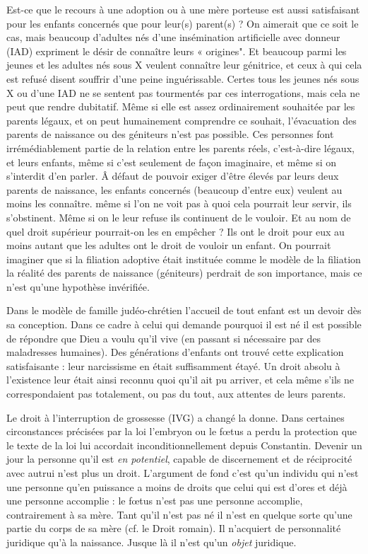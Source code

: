  Est-ce que le recours à une adoption ou à une mère porteuse est aussi satisfaisant pour les enfants concernés que pour leur(s) parent(s) ? On aimerait que ce soit le cas, mais beaucoup d'adultes nés d'une insémination artificielle avec donneur (IAD) expriment le désir de connaître leurs « origines". Et beaucoup parmi les jeunes et les adultes nés sous X veulent connaître leur génitrice, et ceux à qui cela est refusé disent souffrir d'une peine inguérissable. Certes tous les jeunes nés sous X ou d'une IAD ne se sentent pas tourmentés par ces interrogations, mais cela ne peut que rendre dubitatif. Même si elle est assez ordinairement souhaitée par les parents légaux, et on peut humainement comprendre ce souhait, l'évacuation des parents de naissance ou des géniteurs n'est pas possible. Ces personnes font irrémédiablement partie de la relation entre les parents réels, c'est-à-dire légaux, et leurs enfants, même si c'est seulement de façon imaginaire, et même si on s'interdit d'en parler. Â défaut de pouvoir exiger d'être élevés par leurs deux parents de naissance, les enfants concernés (beaucoup d'entre eux) veulent au moins les connaître.  même si l'on ne voit pas à quoi cela pourrait leur servir, ils s'obstinent. Même si on le leur refuse ils continuent de le vouloir. Et au nom de quel droit supérieur pourrait-on les en empêcher ? Ils ont le droit pour eux au moins autant que les adultes ont le droit de vouloir un enfant. On pourrait imaginer que si la filiation adoptive était instituée comme le modèle de la filiation la réalité des parents de naissance (géniteurs) perdrait de son importance, mais ce n'est qu'une hypothèse invérifiée.

Dans le modèle de famille judéo-chrétien l'accueil de tout enfant est un devoir dès sa conception. Dans ce cadre à celui qui demande pourquoi il est né il est possible de répondre que Dieu a voulu qu'il vive (en passant si nécessaire par des maladresses humaines). Des générations d'enfants ont trouvé cette explication satisfaisante : leur narcissisme en était suffisamment étayé. Un droit absolu à l'existence leur était ainsi reconnu quoi qu'il ait pu arriver, et cela même s'ils ne correspondaient pas totalement, ou pas du tout, aux attentes de leurs parents.

Le droit à l'interruption de grossesse (IVG) a changé la donne. Dans certaines circonstances précisées par la loi l'embryon ou le fœtus a perdu la protection que le texte de la loi lui accordait inconditionnellement depuis Constantin. Devenir un jour la personne qu'il est \emph{en potentiel}, capable de discernement et de réciprocité avec autrui  n'est plus un droit. L'argument de fond c'est qu'un individu qui n'est une personne qu'en puissance a moins de droits que celui qui est d'ores et déjà une personne accomplie : le fœtus n'est pas une personne accomplie, contrairement à sa mère. Tant qu'il n'est pas né il n'est en quelque sorte qu'une partie du corps de sa mère (cf. le Droit romain). Il n'acquiert de personnalité juridique qu'à la naissance. Jusque là il n'est qu'un \emph{objet} juridique. 

